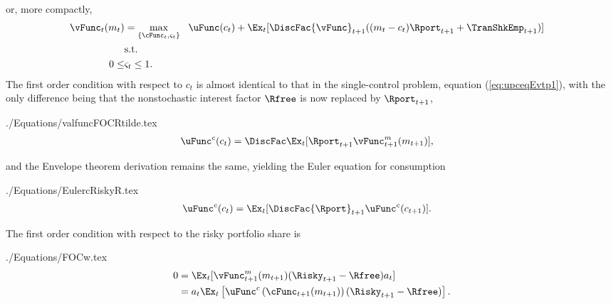 \documentclass[titlepage, headings=optiontotocandhead]{\econtex}
\begin{document}
\unskip
or, more compactly,
\begin{equation*}\begin{gathered}\begin{aligned}
      {\vFunc}_{t}({m}_{t})  & = \max_{\{\cFunc_{t},\varsigma_{t}\}} ~~  \uFunc({c}_{t}) +  \Ex_{t}[\DiscFac {\vFunc}_{t+1}(({m}_{t}-{c}_{t}){\Rport}_{t+1} +        {\TranShkEmp}_{t+1})]
      \\                       & \text{s.t.} & \nonumber
      \\ 0 \leq & \varsigma_{t} \leq 1
      .
    \end{aligned}\end{gathered}\end{equation*}
The first order condition with respect to ${c}_{t}$ is almost identical
to that in the single-control problem, equation (\ref{eq:upceqEvtp1}),
with the only difference being that the nonstochastic interest factor
$\Rfree$ is now replaced by ${\Rport}_{t+1}$,
\begin{verbatimwrite}{./Equations/valfuncFOCRtilde.tex}
  \begin{equation}\begin{gathered}\begin{aligned}
        \uFunc^{{c}}({c}_{t})  & = \DiscFac \Ex_{t} [{\Rport}_{t+1} \vFunc^{{m}}_{t+1}({m}_{t+1})] \label{eq:valfuncFOCRtilde},
      \end{aligned}\end{gathered}\end{equation}
\end{verbatimwrite}
\unskip
and the Envelope theorem derivation remains the same, 
yielding the Euler equation for consumption
\begin{verbatimwrite}{./Equations/EulercRiskyR.tex}
  \begin{equation}\begin{gathered}\begin{aligned}
        \uFunc^{{c}}({c}_{t})  & = \Ex_{t}[\DiscFac {\Rport}_{t+1} \uFunc^{{c}}({c}_{t+1})]. \label{eq:EulercRiskyR}
      \end{aligned}\end{gathered}\end{equation}
\end{verbatimwrite}
\unskip

The first order condition with respect to the risky portfolio share is
\begin{verbatimwrite}{./Equations/FOCw.tex}
  \begin{equation}\begin{gathered}\begin{aligned}
        0  & = \Ex_{t}[{\vFunc}_{t+1}^{{m}}({m}_{t+1})(\Risky_{t+1}-\Rfree){a}_{t}] \notag
        \\         & = {a}_{t}\Ex_{t}\left[\uFunc^{{c}}\left(\cFunc_{t+1}({m}_{t+1})\right)(\Risky_{t+1}-\Rfree)\right] \label{eq:FOCw}.
      \end{aligned}\end{gathered}\end{equation}
\end{verbatimwrite}
\unskip
\end{document}
